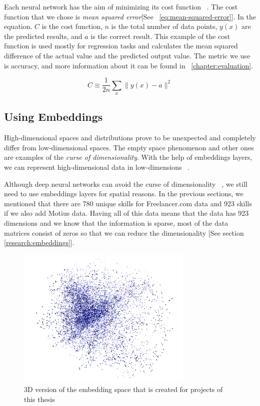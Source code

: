 Each neural network has the aim of minimizing its cost function ~\parencite{Goodfellow-et-al-2016}. The cost function that we chose is \textit{mean squared error}[See ~\eqref{eq:mean-squared-error}]. In the equation. $C$ is the cost function, $n$ is the total number of data points, $y(x)$ are the predicted results, and $a$ is the correct result. This example of the cost function is used mostly for regression tasks and calculates the mean squared difference of the actual value and the predicted output value. The metric we use is accuracy, and more information about it can be found in ~\autoref{chapter:evaluation}.

\begin{equation}
C \equiv \frac{1}{2 n} \sum_{x}\|y(x)-a\|^{2}
\label{eq:mean-squared-error}
\end{equation}


\subsection{Using Embeddings}\label{subsection:using-embeddings}

High-dimensional spaces and distributions prove to be unexpected and completely differ from low-dimensional spaces. The empty space phenomenon and other ones are examples of the \textit{curse of dimensionality}. With the help of embeddings layers, we can represent high-dimensional data in low-dimensions  ~\parencite{lee2007nonlinear}.


Although deep neural networks can avoid the curse of dimensionality ~\parencite{poggio2017and}, we still need to use embeddings layers for spatial reasons. In the previous sections, we mentioned that there are 780 unique skills for Freelancer.com data and 923 skills if we also add Motius data. Having all of this data means that the data has 923 dimensions and we know that the information is sparse, most of the data matrices consist of zeros so that we can reduce the dimensionality [See section \ref{research:embeddings}].

\begin{figure}[htp]
	\centering
	\includegraphics[width=0.75\textwidth]{figures/EmbeddingThesis.png}
	\caption{3D version of the embedding space that is created for projects of this thesis}
	\label{fig:embedding-projection}
\end{figure}


